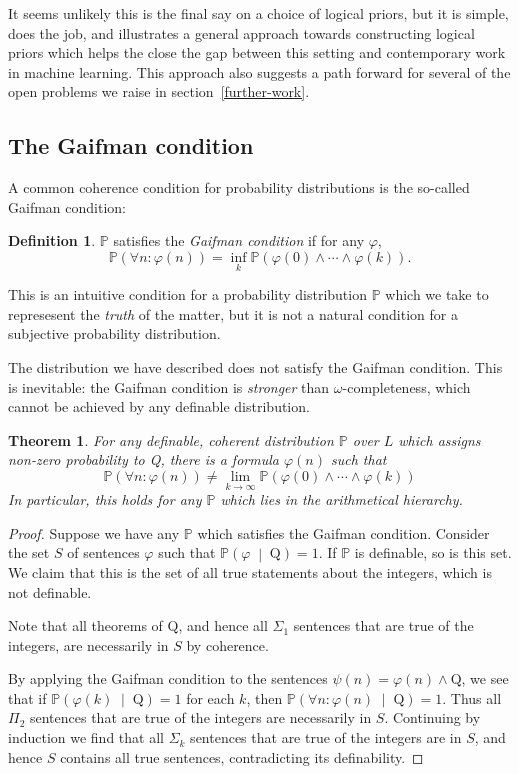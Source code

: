 \documentclass[12pt]{article}
\newtheorem{theorem}{Theorem}
\theoremstyle{definition}
\newtheorem{definition}{Definition}
\newcommand{\of}[1]{\left(#1\right)}
\newcommand{\ofc}[2]{\left(#1\;\middle\vert\;#2\right)}
\newcommand{\PP}{\mathbb{P}}
\newcommand{\Pc}[2]{\PP\ofc{#1}{#2}}
\newcommand{\RQ}{\text{Q}}
\renewcommand{\P}[1]{\mathbb{P}\of{#1}}
\newcommand{\vp}{\varphi}
\begin{document}
It seems unlikely this is the final say on a choice
of logical priors,
but it is simple, does the job,
and illustrates a general approach towards
constructing logical priors which
helps the close the gap between this setting
and contemporary work in machine learning.
This approach also suggests a path forward
for several of the open problems we raise
in section~\ref{further-work}.

\subsection{The Gaifman condition}

A common coherence condition for probability distributions
is the so-called Gaifman condition:
\begin{definition}
$\PP$ satisfies the \emph{Gaifman condition} if for any $\vp$,
\[ \P{\forall n : \vp\of{n}} = \inf\limits_{k} \P{\vp\of{0} \wedge \cdots \wedge \vp\of{k}}. \]
\end{definition}
This is an intuitive condition for a probability distribution $\PP$
which we take to represesent the \emph{truth} of the matter,
but it is not a natural condition for a subjective probability distribution.

The distribution we have described does not satisfy the Gaifman condition.
This is inevitable: the Gaifman condition is \emph{stronger}
than $\omega$-completeness, which cannot be achieved by any definable
distribution.

\begin{theorem}
For any definable, coherent distribution $\PP$ over $L$
which assigns non-zero probability to Q,
there is a formula $\vp\of{n}$
such that
\[ \P{\forall n : \vp\of{n}} \neq \lim\limits_{k \rightarrow \infty} \P{\vp\of{0} \wedge \cdots \wedge \vp\of{k}}\]
In particular, this holds for any $\PP$ which lies in the arithmetical hierarchy.
\end{theorem}
\begin{proof}
Suppose we have any $\PP$
which satisfies the Gaifman condition.
Consider the set $S$ of sentences $\vp$
such that $\Pc{\vp}{\RQ} = 1$.
If $\PP$ is definable, so is this set.
We claim that this is the set of all true
statements about the integers, which is not definable.

Note that all theorems of $\RQ$,
and hence all $\Sigma_1$ sentences that are true of the integers, are necessarily in $S$
by coherence.

By applying the Gaifman condition to the sentences $\psi\of{n} = \vp\of{n} \wedge \RQ$,
we see that if $\Pc{\vp\of{k}}{\RQ} = 1$ for each $k$, then $\Pc{\forall n : \vp\of{n}}{\RQ} = 1$.
Thus all $\Pi_2$ sentences that are true of the integers are necessarily in $S$.
Continuing by induction we find that all $\Sigma_k$ sentences that are true
of the integers are in $S$, and hence $S$ contains all true sentences,
contradicting its definability.
\end{proof}
\end{document}
